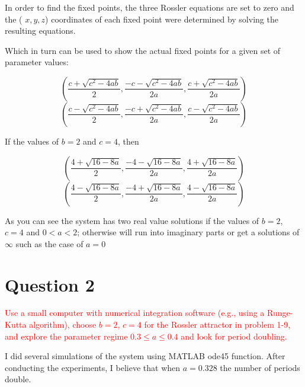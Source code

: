 \documentclass[12pt]{article}
\begin{document}
In order to find the fixed points, the three Rossler equations are set to zero and the ( ${\displaystyle x}, {\displaystyle y}, {\displaystyle z}$) coordinates of each fixed point were determined by solving the resulting equations. 


Which in turn can be used to show the actual fixed points for a given set of parameter values:

$${\displaystyle \left({\frac {c+{\sqrt {c^{2}-4ab}}}{2}},{\frac {-c-{\sqrt {c^{2}-4ab}}}{2a}},{\frac {c+{\sqrt {c^{2}-4ab}}}{2a}}\right)}$$
$${\displaystyle \left({\frac {c-{\sqrt {c^{2}-4ab}}}{2}},{\frac {-c+{\sqrt {c^{2}-4ab}}}{2a}},{\frac {c-{\sqrt {c^{2}-4ab}}}{2a}}\right)}$$


If the values of $b=2$ and $c=4$, then

$${\displaystyle \left({\frac {4+{\sqrt {16-8a}}}{2}},{\frac {-4-{\sqrt {16-8a}}}{2a}},{\frac {4+{\sqrt {16-8a}}}{2a}}\right)}$$
$${\displaystyle \left({\frac {4-{\sqrt {16-8a}}}{2}},{\frac {-4+{\sqrt {16-8a}}}{2a}},{\frac {4-{\sqrt {16-8a}}}{2a}}\right)}$$


As you can see the system has two real value solutions if the values of $b=2$, $c=4$ and $0<a<2$; otherwise will run into imaginary parts or get a solutions of $\infty$ such as the case of $a = 0$ 


\newpage


\section{Question 2}
\textcolor{red}{Use a small computer with numerical integration software (e.g., using a Runge-Kutta algorithm), choose $b = 2$, $c = 4$ for the Rossler attractor in problem 1-9, and explore the parameter regime $0.3 \leq a \leq 0.4$ and look for period doubling.}


\vspace{0.2 in}

I did several simulations of the system using MATLAB ode45 function. After conducting the experiments, I believe that when $a = 0.328$ the number of periods double.\\

\end{document}
